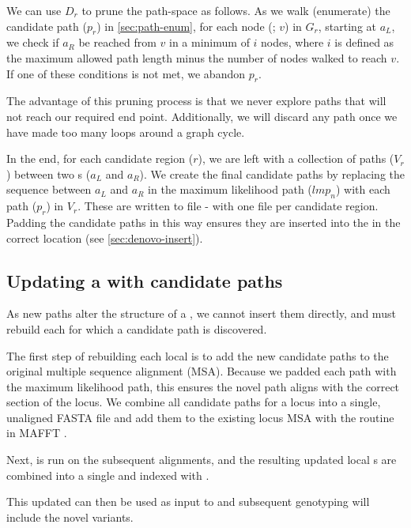 We can use $D_r$ to prune the path-space as follows. As we walk (enumerate) the candidate path ($p_r$) in \autoref{sec:path-enum}, for each node (\kmer{}; $v$) in $G_r$, starting at $a_L$, we check if $a_R$ be reached from $v$ in a minimum of $i$ nodes, where $i$ is defined as the maximum allowed path length minus the number of nodes walked to reach $v$. If one of these conditions is not met, we abandon $p_r$. 

The advantage of this pruning process is that we never explore paths that will not reach our required end point. Additionally, we will discard any path once we have made too many loops around a graph cycle.

\noindent
In the end, for each candidate region ($r$), we are left with a collection of paths ($V_r$) between two \kmer{}s ($a_L$ and $a_R$). We create the final candidate paths by replacing the sequence between $a_L$ and $a_R$ in the maximum likelihood path ($lmp_n$) with each path ($p_r$) in $V_r$. These are written to file - with one file per candidate region. Padding the candidate paths in this way ensures they are inserted into the \prg{} in the correct location (see \autoref{sec:denovo-insert}). 

\subsection{Updating a \panrg{} with candidate paths}
\label{sec:denovo-insert}

As new paths alter the structure of a \prg{}, we cannot insert them directly, and must rebuild each \prg{} for which a candidate path is discovered.

The first step of rebuilding each local \prg{} is to add the new candidate paths to the original multiple sequence alignment (MSA). Because we padded each path with the maximum likelihood path, this ensures the novel path aligns with the correct section of the locus. We combine all candidate paths for a locus into a single, unaligned FASTA file and add them to the existing locus MSA with the  routine in MAFFT \cite{katoh2012}. 

Next, \makeprg{} is run on the subsequent alignments, and the resulting updated local \prg{}s are combined into a single \panrg{} and indexed with \pandora{}. 

This updated \panrg{} can then be used as input to \pandora{} and subsequent genotyping will include the novel variants.


